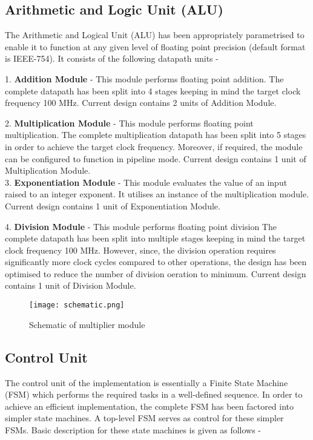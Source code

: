 

\subsection{Arithmetic and Logic Unit (ALU)}
The Arithmetic and Logical Unit (ALU) has been appropriately parametrised to enable it to function at any given level of floating point precision (default format is IEEE-754). It consists of the following datapath units -

1. {\bf Addition Module} - This module performs floating point addition. The complete datapath has been split into 4 stages keeping in mind the target clock frequency 100 MHz. Current design contains 2 units of Addition Module.

2. {\bf Multiplication Module} - This module performs floating point multiplication. The complete multiplication datapath has been split into 5 stages in order to achieve the target clock frequency. Moreover, if required, the module can be configured to function in pipeline mode. Current design contains 1 unit of Multiplication Module.
\\

3. {\bf Exponentiation Module} - This module evaluates the value of an input raised to an integer exponent. It utilises an instance of the multiplication module. Current design contains 1 unit of Exponentiation Module.

4. {\bf Division Module} - This module performs floating point division The complete datapath has been split into multiple stages keeping in mind the target clock frequency 100 MHz. However, since, the division operation requires significantly more clock cycles compared to other operations, the design has been optimised to reduce the number of division oeration to minimum. Current design contains 1 unit of Division Module.

\begin{figure}[H]
\centering
\texttt{[image: schematic.png]}
\caption{Schematic of multiplier module}\label{fig:schematic}
\end{figure}

\subsection{Control Unit}
The control unit of the implementation is essentially a Finite State Machine (FSM) which performs the required tasks in a well-defined sequence. In order to achieve an efficient implementation, the complete FSM has been factored into simpler state machines. A top-level FSM serves as control for these simpler FSMs. Basic description for these state machines is given as follows -

